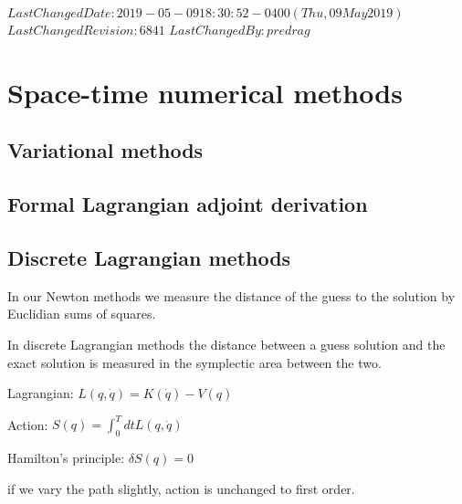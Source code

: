 {$LastChangedDate: 2019-05-09 18:30:52 -0400 (Thu, 09 May 2019) $}
{$LastChangedRevision: 6841 $} {$LastChangedBy: predrag $}

\chapter{Space-time numerical methods}
\label{chap:numerics}

\section{Variational methods}
\label{sect:variational}


\section{Formal Lagrangian adjoint derivation}
\label{sect:Ibragimov}


\section{Discrete {Lagrangian} methods}
\label{sect:symplIntegr}

In our Newton methods we measure the distance of the guess to the solution
by Euclidian sums of squares.

In discrete {Lagrangian} methods the distance between a guess solution and
the exact solution is measured in the symplectic area between the two.

Lagrangian:
\(
L(q,\dot{q})=K(\dot{q})-V(q)
\)

Action:
\(
S(q)=\int_0^T \!dt L(q,\dot{q})
\)

Hamilton's principle:
\(
\delta S(q)=0
\)

if we vary the path slightly, action is
unchanged to first order.

